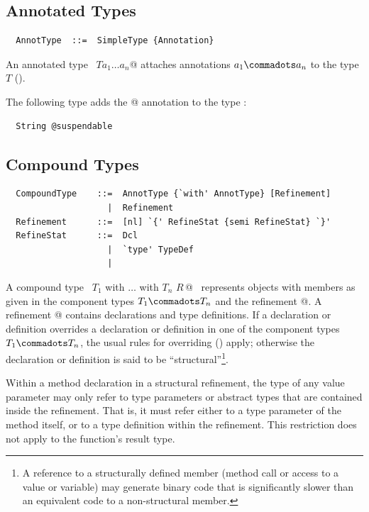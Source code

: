 \subsection{Annotated Types}

\syntax\begin{lstlisting}
  AnnotType  ::=  SimpleType {Annotation}
\end{lstlisting}

An annotated type ~$T$\lstinline@ $a_1 \ldots a_n$@
attaches annotations $a_1 \commadots a_n$ to the type $T$
().

\example The following type adds the @ annotation to the type
:
\begin{lstlisting}
  String @suspendable
\end{lstlisting}

\subsection{Compound Types}
\label{sec:compound-types}
\label{sec:refinements}

\syntax\begin{lstlisting}
  CompoundType    ::=  AnnotType {`with' AnnotType} [Refinement]
                    |  Refinement
  Refinement      ::=  [nl] `{' RefineStat {semi RefineStat} `}'
  RefineStat      ::=  Dcl
                    |  `type' TypeDef
                    |
\end{lstlisting}

A compound type ~\lstinline@$T_1$ with $\ldots$ with $T_n$ {$R\,$}@~
represents objects with members as given in the component types $T_1
\commadots T_n$ and the refinement @. A refinement
@ contains declarations and type definitions. 
If a declaration or definition overrides a declaration or definition in
one of the component types $T_1 \commadots T_n$, the usual rules for
overriding () apply; otherwise the declaration
or definition is said to be ``structural''\footnote{A reference to a
structurally defined member (method call or access to a value or
variable) may generate binary code that is significantly slower than
an equivalent code to a non-structural member.}. 

Within a method declaration in a structural refinement, the type of
any value parameter may only refer to type parameters or abstract
types that are contained inside the refinement. That is, it must refer
either to a type parameter of the method itself, or to a type
definition within the refinement. This restriction does not apply to
the function's result type.

